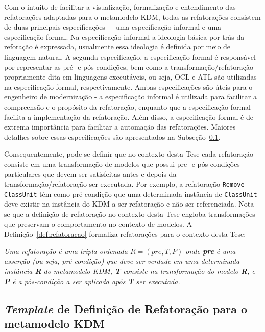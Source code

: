 Com o intuito de facilitar a visualização, formalização e entendimento das refatorações adaptadas para o metamodelo KDM, todas as refatorações consistem de duas principais especificações~\cite{staron2004implementing} - uma especificação informal e uma especificação formal. Na especificação informal a ideologia básica por trás da reforação é expressada, usualmente essa ideologia é definida por meio de linguagem natural. A segunda especificação, a especificação formal é responsável por representar as pré- e pós-condições, bem como a transformação/refatoração propriamente dita em linguagens executáveis, ou seja, OCL e ATL são utilizadas na especificação formal, respectivamente. Ambas especificações são úteis para o engenheiro de modernização - a especificação informal é utilizada para facilitar a compreensão e o propósito da refatoração, enquanto que a especificação formal facilita a implementação da refatoração. Além disso, a especificação formal é de extrema importância para facilitar a automação das refatorações. Maiores detalhes sobre essas especificações são apresentados na Subseção~\ref{sec:template_refatoracao}.

Consequentemente, pode-se definir que no contexto desta Tese cada refatoração consiste em uma transformação de modelos que possui pre- e pós-condições particulares que devem ser satisfeitas antes e depois da transformação/refatoração ser executada. Por exemplo, a refatoração \texttt{Remove ClassUnit} têm como pré-condição que uma determinada instância de \texttt{ClassUnit} deve existir na instância do KDM a ser refatoração e não ser referenciada. Nota-se que a definição de refatoração no contexto desta Tese engloba transformações que preservam o comportamento no contexto de modelos. A Definição~\ref{def:refatoracao} formaliza refatorações para o contexto desta Tese:


\begin{definicao}\label{def:refatoracao}
    \textit{Uma refatoração é uma tripla ordenada $R = (pre, T, P)$ onde \textbf{pre} é uma asserção (ou seja, pré-condição) que deve ser verdade em uma determinada instância \textbf{R} do metamodelo KDM, \textbf{T} consiste na transformação do modelo \textbf{R}, e \textbf{P} é a pós-condição a ser aplicada após \textbf{T} ser executada.}
\end{definicao}


\subsection{\textit{Template} de Definição de Refatoração para o metamodelo KDM}\label{sec:template_refatoracao}

